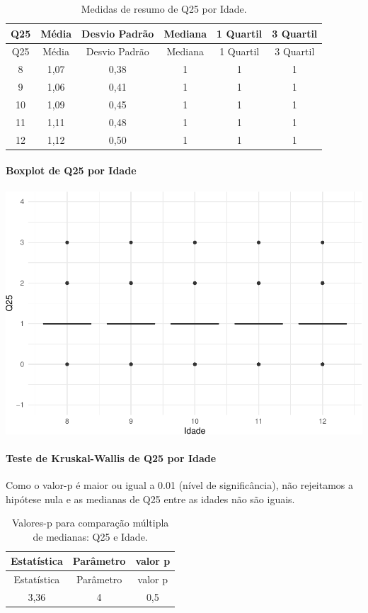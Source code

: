 \documentclass[]{article}
\let\oldparagraph\paragraph
\renewcommand{\paragraph}[1]{\oldparagraph{#1}\mbox{}}
\begin{document}
\begin{longtable}[]{@{}cccccc@{}}
\caption{\label{tab:unnamed-chunk-685}Medidas de resumo de Q25 por Idade.}\tabularnewline
\toprule
Q25 & Média & Desvio Padrão & Mediana & 1 Quartil & 3 Quartil\tabularnewline
\midrule
\endfirsthead
\toprule
Q25 & Média & Desvio Padrão & Mediana & 1 Quartil & 3 Quartil\tabularnewline
\midrule
\endhead
8 & 1,07 & 0,38 & 1 & 1 & 1\tabularnewline
9 & 1,06 & 0,41 & 1 & 1 & 1\tabularnewline
10 & 1,09 & 0,45 & 1 & 1 & 1\tabularnewline
11 & 1,11 & 0,48 & 1 & 1 & 1\tabularnewline
12 & 1,12 & 0,50 & 1 & 1 & 1\tabularnewline
\bottomrule
\end{longtable}

\hypertarget{boxplot-de-q25-por-idade}{%
\paragraph{Boxplot de Q25 por Idade}\label{boxplot-de-q25-por-idade}}

\begin{center}\includegraphics[width=0.75\linewidth]{relatorio_covid19_files/figure-latex/unnamed-chunk-686-1} \end{center}

\hypertarget{teste-de-kruskal-wallis-de-q25-por-idade}{%
\paragraph{Teste de Kruskal-Wallis de Q25 por Idade}\label{teste-de-kruskal-wallis-de-q25-por-idade}}

Como o valor-p é maior ou igual a 0.01 (nível de significância), não rejeitamos a hipótese nula e as medianas de Q25 entre as idades não são iguais.

\begin{longtable}[]{@{}ccc@{}}
\caption{\label{tab:unnamed-chunk-688}Valores-p para comparação múltipla de medianas: Q25 e Idade.}\tabularnewline
\toprule
Estatística & Parâmetro & valor p\tabularnewline
\midrule
\endfirsthead
\toprule
Estatística & Parâmetro & valor p\tabularnewline
\midrule
\endhead
3,36 & 4 & 0,5\tabularnewline
\bottomrule
\end{longtable}
\end{document}
